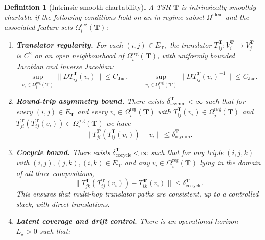 \documentclass[11pt]{article}
\newtheorem{definition}{Definition}
\begin{document}
\begin{definition}[Intrinsic smooth chartability]
\label{def:intrinsic-chartability}
A TSR $\mathbf{T}$ is \emph{intrinsically smoothly chartable} if the
following conditions hold on an in-regime subset $\Omega^{\mathrm{ideal}}$
and the associated feature sets $\Omega_i^{\mathrm{reg}}(\mathbf{T})$:
\begin{enumerate}[]
  \item \textbf{Translator regularity.} For each $(i,j) \in E_{\mathbf{T}}$,
        the translator $T_{ij}^{\mathbf{T}} : V_i^{\mathbf{T}} \to
        V_j^{\mathbf{T}}$ is $C^2$ on an open neighbourhood of
        $\Omega_i^{\mathrm{reg}}(\mathbf{T})$, with uniformly bounded
        Jacobian and inverse Jacobian:
        \[
        \sup_{v_i \in \Omega_i^{\mathrm{reg}}(\mathbf{T})}
        \bigl\|
          D T_{ij}^{\mathbf{T}}(v_i)
        \bigr\|
        \le C_{\mathrm{Jac}},
        \qquad
        \sup_{v_i \in \Omega_i^{\mathrm{reg}}(\mathbf{T})}
        \bigl\|
          D T_{ij}^{\mathbf{T}}(v_i)^{-1}
        \bigr\|
        \le C_{\mathrm{Jac}}.
        \]
  \item \textbf{Round-trip asymmetry bound.} There exists
        $\delta_{\mathrm{asymm}}^{\mathbf{T}} < \infty$ such that for every
        $(i,j) \in E_{\mathbf{T}}$ and every
        $v_i \in \Omega_i^{\mathrm{reg}}(\mathbf{T})$ with
        $T_{ij}^{\mathbf{T}}(v_i) \in \Omega_j^{\mathrm{reg}}(\mathbf{T})$
        and $T_{ji}^{\mathbf{T}}(T_{ij}^{\mathbf{T}}(v_i))
        \in \Omega_i^{\mathrm{reg}}(\mathbf{T})$ we have
        \[
        \bigl\|
          T_{ji}^{\mathbf{T}}(T_{ij}^{\mathbf{T}}(v_i)) - v_i
        \bigr\|
        \le \delta_{\mathrm{asymm}}^{\mathbf{T}}.
        \]
  \item \textbf{Cocycle bound.} There exists
        $\delta_{\mathrm{cocycle}}^{\mathbf{T}} < \infty$ such that for any
        triple $(i,j,k)$ with $(i,j), (j,k), (i,k) \in E_{\mathbf{T}}$ and
        any $v_i \in \Omega_i^{\mathrm{reg}}(\mathbf{T})$ lying in the domain
        of all three compositions,
        \[
        \bigl\|
          T_{jk}^{\mathbf{T}}(T_{ij}^{\mathbf{T}}(v_i)) -
          T_{ik}^{\mathbf{T}}(v_i)
        \bigr\|
        \le \delta_{\mathrm{cocycle}}^{\mathbf{T}}.
        \]
        This ensures that multi-hop translator paths are consistent, up to a
        controlled slack, with direct translations.
  \item \textbf{Latent coverage and drift control.}
        There is an operational horizon $L_\star > 0$ such that:
        \begin{itemize}

\end{itemize}
\end{enumerate}
\end{definition}
\end{document}
